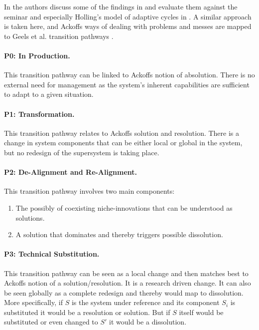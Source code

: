 \documentclass[a4paper,11pt]{article}
\begin{document}
In \cite[p.~77]{grabe2020seminar} the authors discuss some of the findings in
\cite{geels2007typology} and evaluate them against the seminar and especially
Holling's model of adaptive cycles in \cite{holling2001understanding}. A
similar approach is taken here, and Ackoffs ways of dealing with problems and
messes are mapped to Geels et al. transition pathways
\cite{geels2007typology}.

\paragraph{P0: In Production.}
This transition pathway can be linked to Ackoffs notion of absolution. There
is no external need for management as the system's inherent capabilities are
sufficient to adapt to a given situation.

\paragraph{P1: Transformation.}
This transition pathway relates to Ackoffs solution and resolution. There is a
change in system components that can be either local or global in the system,
but no redesign of the supersystem is taking place.

\paragraph{P2: De-Alignment and Re-Alignment.}
This transition pathway involves two main components: 
\begin{enumerate}[noitemsep]
\item The possibly of coexisting niche-innovations that can be understood as
  solutions.
\item A solution that dominates and thereby triggers possible dissolution.
\end{enumerate}

\paragraph{P3: Technical Substitution.}
This transition pathway can be seen as a local change and then matches best to
Ackoffs notion of a solution/resolution. It is a research driven change. It
can also be seen globally as a complete redesign and thereby would map to
dissolution. More specifically, if $S$ is the system under reference and its
component $S_i$ is substituted it would be a resolution or solution. But if
$S$ itself would be substituted or even changed to $S'$ it would be a
dissolution.
\end{document}
